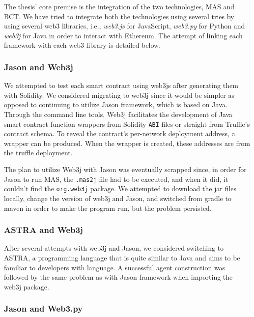  \vspace{.5cm}

The thesis' core premise is the integration of the two technologies, \ac{MAS} and \ac{BCT}. We have tried to integrate both the technologies using several tries by using several web3 libraries, i.e., \textit{web3.js} for JavaScript, \textit{web3.py} for Python and \textit{web3j} for Java in order to interact with Ethereum. The attempt of linking each framework with each web3 library is detailed below.

\subsubsection{Jason and Web3j}

We attempted to test each smart contract using web3js after generating them with Solidity. We considered migrating to web3j since it would be simpler as opposed to continuing to utilize Jason framework, which is based on Java. Through the command line tools, Web3j facilitates the development of Java smart contract function wrappers from Solidity \texttt{ABI} files or straight from Truffle's contract schema. To reveal the contract's per-network deployment address, a wrapper can be produced. When the wrapper is created, these addresses are from the truffle deployment.

\vspace{.5cm}

The plan to utilize Web3j with Jason was eventually scrapped since, in order for Jason to run \ac{MAS}, the \texttt{.mas2j} file had to be executed, and when it did, it couldn't find the \texttt{org.web3j} package. We attempted to download the jar files locally, change the version of web3j and Jason, and switched from gradle to maven in order to make the program run, but the problem persisted.

\subsubsection{ASTRA and Web3j}

After several attempts with web3j and Jason, we considered switching to ASTRA, a programming language that is quite similar to Java and aims to be familiar to developers with language. A successful agent construction was followed by the same problem as with Jason framework when importing the web3j package.

\subsubsection{Jason and Web3.py}


